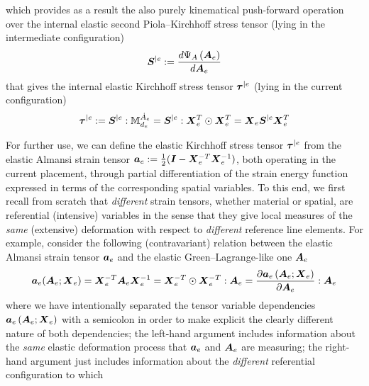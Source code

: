 \documentclass[preprint,review,12pt,sort&compress]{elsarticle}%
\renewcommand{\mathbf}[1]{\mbox{\boldmath $#1$ \unboldmath}  \!\!}
\begin{document}
which provides as a result the also purely kinematical push-forward operation
over the internal elastic second Piola--Kirchhoff stress tensor (lying in the
intermediate configuration)%
\begin{equation}
\mathbf{S}^{|e}:=\frac{d\Psi_{A}\left(  \mathbf{A}_{e}\right)  }%
{d\mathbf{A}_{e}} \label{S|e}%
\end{equation}
that gives the internal elastic Kirchhoff stress tensor $\mathbf{\tau}^{|e}$
(lying in the current configuration)%
\begin{equation}
\mathbf{\tau}^{|e}:=\mathbf{S}^{|e}:\mathbb{M}_{d_{e}}^{\dot{A}_{e}%
}=\mathbf{S}^{|e}:\mathbf{X}_{e}^{T}\odot\mathbf{X}_{e}^{T}=\mathbf{X}%
_{e}\mathbf{S}^{|e}\mathbf{X}_{e}^{T} \label{taue Se}%
\end{equation}


For further use, we can define the elastic Kirchhoff stress tensor
$\mathbf{\tau}^{|e}$ from the elastic Almansi strain tensor $\mathbf{a}%
_{e}:=\frac{1}{2}(\mathbf{I}-\mathbf{X}_{e}^{-T}\mathbf{X}_{e}^{-1})$, both
operating in the current placement, through partial differentiation of the
strain energy function expressed in terms of the corresponding spatial
variables. To this end, we first recall from scratch that \emph{different}
strain tensors, whether material or spatial, are referential (intensive)
variables in the sense that they give local measures of the \emph{same}
(extensive) deformation with respect to \emph{different} reference line
elements. For example, consider the following (contravariant) relation between
the elastic Almansi strain tensor $\mathbf{a}_{e}$ and the elastic
Green--Lagrange-like one $\mathbf{A}_{e}$%
\begin{equation}
\mathbf{a}_{e}(\mathbf{A}_{e};\mathbf{X}_{e})=\mathbf{X}_{e}^{-T}%
\mathbf{A}_{e}\mathbf{X}_{e}^{-1}=\mathbf{X}_{e}^{-T}\odot\mathbf{X}_{e}%
^{-T}:\mathbf{A}_{e}=\frac{\partial\mathbf{a}_{e}\left(  \mathbf{A}%
_{e};\mathbf{X}_{e}\right)  }{\partial\mathbf{A}_{e}}:\mathbf{A}_{e}
\label{ae(Ae;Xe)}%
\end{equation}
where we have intentionally separated the tensor variable dependencies
$\mathbf{a}_{e}\left(  \mathbf{A}_{e};\mathbf{X}_{e}\right)  $ with a
semicolon in order to make explicit the clearly different nature of both
dependencies; the left-hand argument includes information about the
\emph{same} elastic deformation process that $\mathbf{a}_{e}$ and
$\mathbf{A}_{e}$ are measuring; the right-hand argument just includes
information about the \emph{different} referential configuration to which
\end{document}
